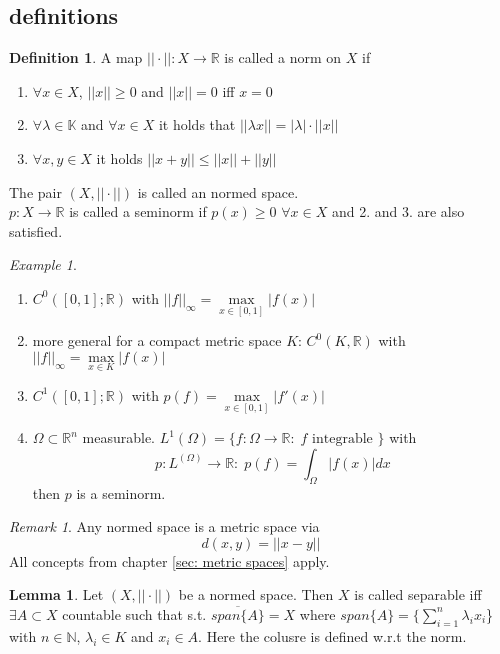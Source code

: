 \documentclass[a4paper, 12pt]{article}
\theoremstyle{plain}
\theoremstyle{definition}
\newtheorem{definition}[theorem]{Definition} %
\theoremstyle{lemma}
\newtheorem{lemma}[theorem]{Lemma}
\theoremstyle{remark}
\newtheorem{remark}[theorem]{Remark}
\theoremstyle{corollary}
\theoremstyle{example}
\newtheorem{example}[theorem]{Example}
\begin{document}
	\subsection{definitions}
	\begin{definition}
		A map $||\cdot||: X \to \mathbb{R}$ is called a norm on $X$ if \begin{enumerate}
			\item $\forall x \in X$, $||x||\geq 0$ and $||x|| = 0$ iff $x = 0$
			\item $\forall \lambda \in \mathbb{K}$ and $\forall x \in X$ it holds that $||\lambda x|| = \left|\lambda\right|\cdot ||x||$
			\item $\forall x, y \in X$ it holds $||x+y|| \leq ||x|| + ||y||$
		\end{enumerate}
		The pair $(X,||\cdot||)$ is called an normed space.\\
		
		\noindent $p:X \to \mathbb{R}$ is called a seminorm if $p(x) \geq 0$ $\forall x \in X$ and 2. and 3. are also satisfied.
	\end{definition}
	
	\begin{example}
		\begin{enumerate}
			\item $C^0([0,1]; \mathbb{R})$ with $||f||_\infty = \max\limits_{x \in [0,1]} \left|f(x)\right|$
			\item more general for a compact metric space $K$: $C^0(K,\mathbb{R})$ with $||f||_\infty = \max\limits_{x \in K} \left|f(x)\right|$
			\item $C^1([0,1]; \mathbb{R})$ with $p(f) = \max\limits_{x \in [0,1]} \left|f'(x)\right|$
			\item $\Omega \subset \mathbb{R}^n$ measurable. $L^1(\Omega) = \{f: \Omega \to \mathbb{R}: \; f \text{ integrable }\}$ with \[p: L^(\Omega) \to \mathbb{R}: \; p(f) = \int_{\Omega} \left|f(x)\right|dx\] then $p$ is a seminorm.
		\end{enumerate}
	\end{example}
	\begin{remark}
		Any normed space is a metric space via \[d(x,y) = ||x-y||\] All concepts from chapter \ref{sec: metric spaces} apply.
	\end{remark}
	
	\begin{lemma}
		Let $(X,||\cdot||)$ be a normed space. Then $X$ is called separable iff $\exists A \subset X$ countable such that s.t. $\overline{span\{A\}} = X$ where $span\{A\} = \{\sum_{i=1}^{n} \lambda_i x_i$\} with $n \in \mathbb{N}$, $\lambda_i \in K$ and $x_i \in A$. Here the colusre is defined w.r.t the norm.
	\end{lemma}
	
\end{document}
